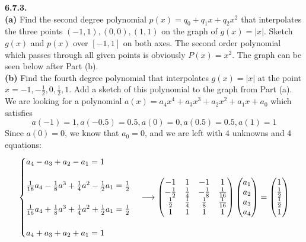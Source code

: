 \documentclass{exam}
\begin{document}
\begin{questions}
\newpage
\textbf{6.7.3. } \\


\textbf{(a) }
Find the second degree polynomial $p(x) = q_0 + q_1x + q_2x^2$ that interpolates the three points $(-1, 1), (0, 0), (1, 1)$ on the graph of $g(x) = |x|$. Sketch $g(x)$ and $p(x)$ over $[-1, 1]$ on both axes.
\sol
The second order polynomial which passes through all given points is obviously $P(x) = x^2$. The graph can be seen below after Part (b). \\



\textbf{(b) }
Find the fourth degree polynomial that interpolates $g(x) = |x|$ at the point $x = -1, -\frac{1}{2}, 0, \frac{1}{2}, 1$. Add a sketch of this polynomial to the graph from Part (a).
\sol
We are looking for a polynomial $a(x) = a_4x^4 + a_3x^3 + a_2x^2 + a_1x + a_0$ which satisfies
$$a(-1) = 1, a(-0.5) = 0.5, a(0) = 0, a(0.5) = 0.5, a(1) = 1$$
Since $a(0) = 0$, we know that $a_0 = 0$, and we are left with 4 unknowns and 4 equations:
$$\begin{cases}
    a_4 - a_3 + a_2 - a_1 = 1 \\
    \\
    \frac{1}{16}a_4 - \frac{1}{8}a^3 + \frac{1}{4}a^2 - \frac{1}{2}a_1 = \frac{1}{2} \\
    \\
    \frac{1}{16}a_4 + \frac{1}{8}a^3 + \frac{1}{4}a^2 + \frac{1}{2}a_1 = \frac{1}{2} \\
    \\
    a_4 + a_3 + a_2 + a_1 = 1 \\
\end{cases} \longrightarrow \left( \begin{matrix}
    -1 & 1 & -1 & 1\\
    -\frac{1}{2} & \frac{1}{4} & -\frac{1}{8} & \frac{1}{16} \\
    \frac{1}{2} & \frac{1}{4} & \frac{1}{8} & \frac{1}{16} \\
    1 & 1 & 1 & 1 \\
\end{matrix} \right)\left( \begin{matrix}
    a_1 \\ a_2 \\ a_3 \\ a_4 \\
\end{matrix} \right) = \left( \begin{matrix}
    1 \\ \frac{1}{2} \\ \frac{1}{2} \\ 1 \\
\end{matrix} \right)$$


\end{questions}
\end{document}
